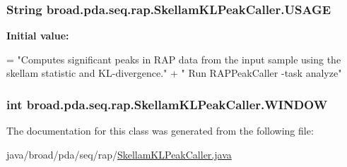 \hypertarget{classbroad_1_1pda_1_1seq_1_1rap_1_1_skellam_k_l_peak_caller_a2f699a4296f23185c2ef1794d8b8621a}{
\subsubsection[{U\+S\+A\+G\+E}]{\setlength{\rightskip}{0pt plus 5cm}String broad.\+pda.\+seq.\+rap.\+Skellam\+K\+L\+Peak\+Caller.\+U\+S\+A\+G\+E}}\label{classbroad_1_1pda_1_1seq_1_1rap_1_1_skellam_k_l_peak_caller_a2f699a4296f23185c2ef1794d8b8621a}
{\bfseries Initial value\+:}
\begin{DoxyCode}
= \textcolor{stringliteral}{"Computes significant peaks in RAP data from the input sample using the skellam statistic and
       KL-divergence."} +
            \textcolor{stringliteral}{" Run RAPPeakCaller -task analyze"}
\end{DoxyCode}
\hypertarget{classbroad_1_1pda_1_1seq_1_1rap_1_1_skellam_k_l_peak_caller_a9f35f4842423c43fc1f6b9f5f32b04e3}{
\subsubsection[{W\+I\+N\+D\+O\+W}]{\setlength{\rightskip}{0pt plus 5cm}int broad.\+pda.\+seq.\+rap.\+Skellam\+K\+L\+Peak\+Caller.\+W\+I\+N\+D\+O\+W}}\label{classbroad_1_1pda_1_1seq_1_1rap_1_1_skellam_k_l_peak_caller_a9f35f4842423c43fc1f6b9f5f32b04e3}


The documentation for this class was generated from the following file\+:\begin{DoxyCompactItemize}
\item 
java/broad/pda/seq/rap/\hyperlink{_skellam_k_l_peak_caller_8java}{Skellam\+K\+L\+Peak\+Caller.\+java}\end{DoxyCompactItemize}
